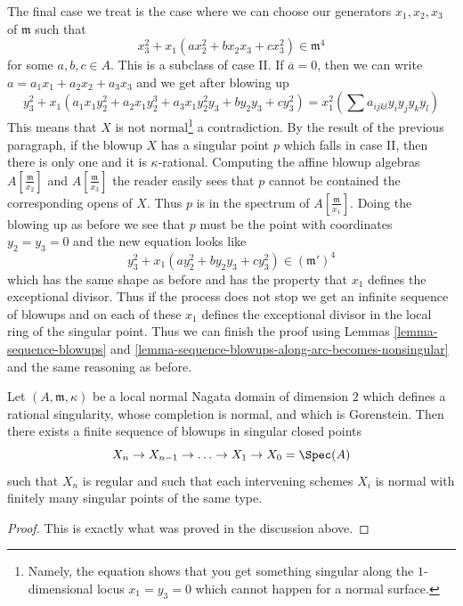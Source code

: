 \medskip\noindent
The final case we treat is the case where we can choose our generators
$x_1, x_2, x_3$ of $\mathfrak m$ such that
$$
x_3^2 + x_1(a x_2^2 + b x_2x_3 + c x_3^2) \in \mathfrak m^4
$$
for some $a, b, c \in A$. This is a subclass of case II. If
$\overline{a} = 0$, then we can write
$a = a_1 x_1 + a_2 x_2 + a_3 x_3$ and we get after blowing up
$$
y_3^2 + x_1(a_1 x_1 y_2^2 + a_2 x_1 y_2^3 + a_3 x_1 y_2^2 y_3 +
b y_2 y_3 + c y_3^2) = x_1^2 (\sum a_{ijkl}y_iy_jy_ky_l)
$$
This means that $X$ is not normal\footnote{Namely, the
equation shows that you get something singular along the
$1$-dimensional locus $x_1 = y_3 = 0$ which cannot happen
for a normal surface.} a contradiction. By the result
of the previous paragraph, if the blowup $X$
has a singular point $p$ which falls in case II, then
there is only one and it is $\kappa$-rational.
Computing the affine blowup algebras
$A[\frac{\mathfrak m}{x_2}]$ and $A[\frac{\mathfrak m}{x_3}]$
the reader easily sees that $p$ cannot be contained
the corresponding opens of $X$. Thus $p$ is in the spectrum
of $A[\frac{\mathfrak m}{x_1}]$. Doing the blowing up as before we see that
$p$ must be the point with coordinates $y_2 = y_3 = 0$ and the new
equation looks like
$$
y_3^2 + x_1(a y_2^2 + b y_2 y_3 + c y_3^2) \in (\mathfrak m')^4
$$
which has the same shape as before and has the property
that $x_1$ defines the exceptional divisor. Thus if the process
does not stop we get an infinite sequence of blowups and on
each of these $x_1$ defines the exceptional divisor in the
local ring of the singular point. Thus we can
finish the proof using
Lemmas \ref{lemma-sequence-blowups} and
\ref{lemma-sequence-blowups-along-arc-becomes-nonsingular}
and the same reasoning as before.

\begin{lemma}
\label{lemma-resolve-rational-double-points}
Let $(A, \mathfrak m, \kappa)$ be a local normal Nagata
domain of dimension $2$ which defines a rational singularity,
whose completion is normal, and which is Gorenstein.
Then there exists a finite sequence of blowups in
singular closed points
$$
X_n \to X_{n - 1} \to \ldots \to X_1 \to X_0 = \Spec(A)
$$
such that $X_n$ is regular and such that each intervening
schemes $X_i$ is normal with finitely many singular points
of the same type.
\end{lemma}

\begin{proof}
This is exactly what was proved in the discussion above.
\end{proof}




